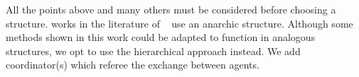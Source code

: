 \documentclass[../main.tex]{subfiles}
\begin{document}
All the points above and many others must be considered before choosing a structure.
 works in the literature of \dmpc\ \cite{VelardeEtAl2017a, BoemEtAl2020, LiuEtAl2022} use an anarchic structure.
Although some methods shown in this work could be adapted to function in analogous structures, we opt to use the hierarchical approach instead. We add coordinator(s) which referee the exchange between agents.

\end{document}
